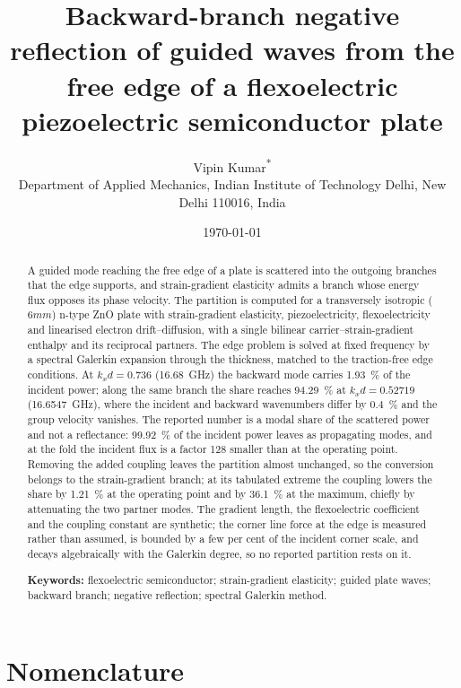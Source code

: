 \documentclass[10pt,a4paper]{article}
\title{\bfseries Backward-branch negative reflection of guided waves from the
free edge of a flexoelectric piezoelectric semiconductor plate}
\author{Vipin Kumar\textsuperscript{*}\\[2pt]
\small Department of Applied Mechanics, Indian Institute of Technology Delhi,
New Delhi 110016, India}
\date{\today}
\begin{document}
\maketitle

\begin{abstract}
\noindent
A guided mode reaching the free edge of a plate is scattered into the outgoing
branches that the edge supports, and strain-gradient elasticity admits a branch
whose energy flux opposes its phase velocity.  The partition is computed for a
transversely isotropic ($6mm$) n-type ZnO plate with strain-gradient
elasticity, piezoelectricity, flexoelectricity and linearised electron
drift--diffusion, with a single bilinear carrier--strain-gradient enthalpy and
its reciprocal partners.  The edge problem is solved at fixed frequency by a
spectral Galerkin expansion through the thickness, matched to the
traction-free edge conditions.  At $k_xd=0.736$ (\SI{16.68}{\giga\hertz}) the
backward mode carries \SI{1.93}{\percent} of the incident power; along the same
branch the share reaches \SI{94.29}{\percent} at $k_xd=0.52719$
(\SI{16.6547}{\giga\hertz}), where the incident and backward wavenumbers differ
by \SI{0.4}{\percent} and the group velocity vanishes.  The reported number is
a modal share of the scattered power and not a reflectance:
\SI{99.92}{\percent} of the incident power leaves as propagating modes, and at
the fold the incident flux is a factor 128 smaller than at the operating point.
Removing the added coupling leaves the partition almost unchanged, so the
conversion belongs to the strain-gradient branch; at its tabulated extreme the
coupling lowers the share by \SI{1.21}{\percent} at the operating point and by
\SI{36.1}{\percent} at the maximum, chiefly by attenuating the two partner
modes.  The
gradient length, the flexoelectric coefficient and the coupling constant are
synthetic; the corner line force at the edge is measured rather than assumed, is
bounded by a few per cent of the incident corner scale, and decays algebraically
with the Galerkin degree, so no reported partition rests on it.

\medskip
\noindent\textbf{Keywords:} flexoelectric semiconductor; strain-gradient
elasticity; guided plate waves; backward branch; negative reflection; spectral
Galerkin method.
\end{abstract}

\section*{Nomenclature}
\end{document}
